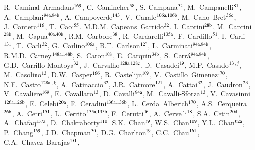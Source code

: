 \begin{flushleft}
R.~Caminal~Armadans$^\textrm{\scriptsize 169}$,
C.~Camincher$^\textrm{\scriptsize 58}$,
S.~Campana$^\textrm{\scriptsize 32}$,
M.~Campanelli$^\textrm{\scriptsize 81}$,
A.~Camplani$^\textrm{\scriptsize 94a,94b}$,
A.~Campoverde$^\textrm{\scriptsize 143}$,
V.~Canale$^\textrm{\scriptsize 106a,106b}$,
M.~Cano~Bret$^\textrm{\scriptsize 36c}$,
J.~Cantero$^\textrm{\scriptsize 116}$,
T.~Cao$^\textrm{\scriptsize 155}$,
M.D.M.~Capeans~Garrido$^\textrm{\scriptsize 32}$,
I.~Caprini$^\textrm{\scriptsize 28b}$,
M.~Caprini$^\textrm{\scriptsize 28b}$,
M.~Capua$^\textrm{\scriptsize 40a,40b}$,
R.M.~Carbone$^\textrm{\scriptsize 38}$,
R.~Cardarelli$^\textrm{\scriptsize 135a}$,
F.~Cardillo$^\textrm{\scriptsize 51}$,
I.~Carli$^\textrm{\scriptsize 131}$,
T.~Carli$^\textrm{\scriptsize 32}$,
G.~Carlino$^\textrm{\scriptsize 106a}$,
B.T.~Carlson$^\textrm{\scriptsize 127}$,
L.~Carminati$^\textrm{\scriptsize 94a,94b}$,
R.M.D.~Carney$^\textrm{\scriptsize 148a,148b}$,
S.~Caron$^\textrm{\scriptsize 108}$,
E.~Carquin$^\textrm{\scriptsize 34b}$,
S.~Carr\'a$^\textrm{\scriptsize 94a,94b}$,
G.D.~Carrillo-Montoya$^\textrm{\scriptsize 32}$,
J.~Carvalho$^\textrm{\scriptsize 128a,128c}$,
D.~Casadei$^\textrm{\scriptsize 19}$,
M.P.~Casado$^\textrm{\scriptsize 13}$$^{,j}$,
M.~Casolino$^\textrm{\scriptsize 13}$,
D.W.~Casper$^\textrm{\scriptsize 166}$,
R.~Castelijn$^\textrm{\scriptsize 109}$,
V.~Castillo~Gimenez$^\textrm{\scriptsize 170}$,
N.F.~Castro$^\textrm{\scriptsize 128a}$$^{,k}$,
A.~Catinaccio$^\textrm{\scriptsize 32}$,
J.R.~Catmore$^\textrm{\scriptsize 121}$,
A.~Cattai$^\textrm{\scriptsize 32}$,
J.~Caudron$^\textrm{\scriptsize 23}$,
V.~Cavaliere$^\textrm{\scriptsize 169}$,
E.~Cavallaro$^\textrm{\scriptsize 13}$,
D.~Cavalli$^\textrm{\scriptsize 94a}$,
M.~Cavalli-Sforza$^\textrm{\scriptsize 13}$,
V.~Cavasinni$^\textrm{\scriptsize 126a,126b}$,
E.~Celebi$^\textrm{\scriptsize 20a}$,
F.~Ceradini$^\textrm{\scriptsize 136a,136b}$,
L.~Cerda~Alberich$^\textrm{\scriptsize 170}$,
A.S.~Cerqueira$^\textrm{\scriptsize 26b}$,
A.~Cerri$^\textrm{\scriptsize 151}$,
L.~Cerrito$^\textrm{\scriptsize 135a,135b}$,
F.~Cerutti$^\textrm{\scriptsize 16}$,
A.~Cervelli$^\textrm{\scriptsize 18}$,
S.A.~Cetin$^\textrm{\scriptsize 20d}$,
A.~Chafaq$^\textrm{\scriptsize 137a}$,
D.~Chakraborty$^\textrm{\scriptsize 110}$,
S.K.~Chan$^\textrm{\scriptsize 59}$,
W.S.~Chan$^\textrm{\scriptsize 109}$,
Y.L.~Chan$^\textrm{\scriptsize 62a}$,
P.~Chang$^\textrm{\scriptsize 169}$,
J.D.~Chapman$^\textrm{\scriptsize 30}$,
D.G.~Charlton$^\textrm{\scriptsize 19}$,
C.C.~Chau$^\textrm{\scriptsize 161}$,
C.A.~Chavez~Barajas$^\textrm{\scriptsize 151}$,

\end{flushleft}
